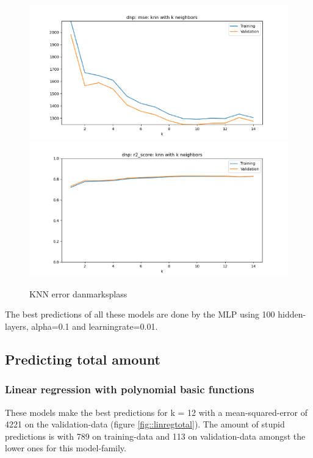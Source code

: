 \documentclass[12pt,a4paper]{scrartcl}		%
\begin{document}
\begin{figure}[h]
    \centering
    \includegraphics[scale = 0.8]{dnp_knn_mse.png}
    \includegraphics[scale = 0.8]{dnp_knn_r2.png}
    \caption{KNN error danmarksplass}
    \label{fig::knndnp}
\end{figure}

The best predictions of all these models are done by the MLP using 100 hidden-layers, alpha=0.1 and learningrate=0.01.

\subsection{Predicting total amount}

\subsubsection{Linear regression with polynomial basic functions}
These models make the best predictions for k = 12 with a mean-squared-error of 4221 on the validation-data (figure \ref{fig::linregtotal}). 
The amount of stupid predictions is with 789 on training-data and 113 on validation-data amongst the lower ones for this model-family. 
\end{document}
